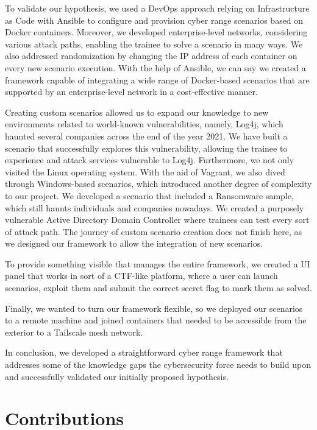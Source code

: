 To validate our hypothesis, we used a DevOps approach relying on Infrastructure as Code with Ansible to configure and provision cyber range scenarios based on Docker containers. Moreover, we developed enterprise-level networks, considering various attack paths, enabling the trainee to solve a scenario in many ways. We also addressed randomization by changing the IP address of each container on every new scenario execution. With the help of Ansible, we can say we created a framework capable of integrating a wide range of Docker-based scenarios that are supported by an enterprise-level network in a cost-effective manner.

Creating custom scenarios allowed us to expand our knowledge to new environments related to world-known vulnerabilities, namely, Log4j, which haunted several companies across the end of the year 2021. We have built a scenario that successfully explores this vulnerability, allowing the trainee to experience and attack services vulnerable to Log4j. Furthermore, we not only visited the Linux operating system. With the aid of Vagrant, we also dived through Windows-based scenarios, which introduced another degree of complexity to our project. We developed a scenario that included a Ransomware sample, which still haunts individuals and companies nowadays. We created a purposely vulnerable Active Directory Domain Controller where trainees can test every sort of attack path. The journey of custom scenario creation does not finish here, as we designed our framework to allow the integration of new scenarios. 

To provide something visible that manages the entire framework, we created a UI panel that works in sort of a CTF-like platform, where a user can launch scenarios, exploit them and submit the correct secret flag to mark them as solved. 

Finally, we wanted to turn our framework flexible, so we deployed our scenarios to a remote machine and joined containers that needed to be accessible from the exterior to a Tailscale mesh network.

In conclusion, we developed a straightforward cyber range framework that addresses some of the knowledge gaps the cybersecurity force needs to build upon and successfully validated our initially proposed hypothesis. 

\section{Contributions} \label{sec:contributions}

